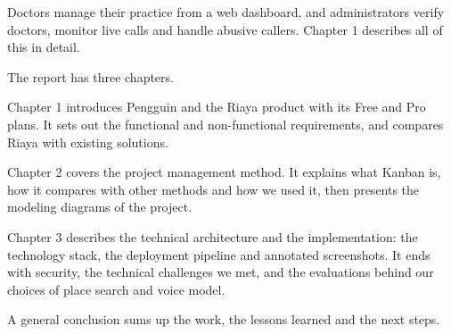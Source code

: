 Doctors manage their practice from a web dashboard, and administrators verify doctors, monitor live calls and handle abusive callers. Chapter 1 describes all of this in detail.

The report has three chapters.

Chapter 1 introduces Pengguin and the Riaya product with its Free and Pro plans. It sets out the functional and non-functional requirements, and compares Riaya with existing solutions.

Chapter 2 covers the project management method. It explains what Kanban is, how it compares with other methods and how we used it, then presents the modeling diagrams of the project.

Chapter 3 describes the technical architecture and the implementation: the technology stack, the deployment pipeline and annotated screenshots. It ends with security, the technical challenges we met, and the evaluations behind our choices of place search and voice model.

A general conclusion sums up the work, the lessons learned and the next steps.

\endgroup
